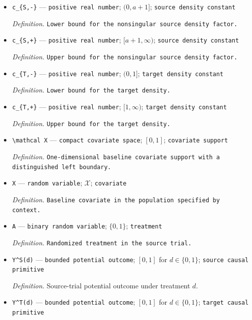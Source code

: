 \documentclass{article}
\begin{document}
\begin{itemize}
  \item \texttt{c\_\allowbreak{}\{S,\allowbreak{}-\allowbreak{}\}\allowbreak{}} --- \texttt{positive real number}; \((0,a+1]\); \texttt{source density constant}
  \par\smallskip\noindent\emph{Definition.} \texttt{Lower bound for the nonsingular source density factor.}
  \item \texttt{c\_\allowbreak{}\{S,\allowbreak{}+\allowbreak{}\}\allowbreak{}} --- \texttt{positive real number}; \([a+1,\infty)\); \texttt{source density constant}
  \par\smallskip\noindent\emph{Definition.} \texttt{Upper bound for the nonsingular source density factor.}
  \item \texttt{c\_\allowbreak{}\{T,\allowbreak{}-\allowbreak{}\}\allowbreak{}} --- \texttt{positive real number}; \((0,1]\); \texttt{target density constant}
  \par\smallskip\noindent\emph{Definition.} \texttt{Lower bound for the target density.}
  \item \texttt{c\_\allowbreak{}\{T,\allowbreak{}+\allowbreak{}\}\allowbreak{}} --- \texttt{positive real number}; \([1,\infty)\); \texttt{target density constant}
  \par\smallskip\noindent\emph{Definition.} \texttt{Upper bound for the target density.}
  \item \texttt{\textbackslash{}\allowbreak{}mathcal X} --- \texttt{compact covariate space}; \([0,1]\); \texttt{covariate support}
  \par\smallskip\noindent\emph{Definition.} \texttt{One-\allowbreak{}dimensional baseline covariate support with a distinguished left boundary.}
  \item \texttt{X} --- \texttt{random variable}; \(\mathcal X\); \texttt{covariate}
  \par\smallskip\noindent\emph{Definition.} \texttt{Baseline covariate in the population specified by context.}
  \item \texttt{A} --- \texttt{binary random variable}; \(\{0,1\}\); \texttt{treatment}
  \par\smallskip\noindent\emph{Definition.} \texttt{Randomized treatment in the source trial.}
  \item \texttt{Y\textasciicircum{}S(d)} --- \texttt{bounded potential outcome}; \([0,1]\) for \(d\in\{0,1\}\); \texttt{source causal primitive}
  \par\smallskip\noindent\emph{Definition.} Source-trial potential outcome under treatment \(d\).
  \item \texttt{Y\textasciicircum{}T(d)} --- \texttt{bounded potential outcome}; \([0,1]\) for \(d\in\{0,1\}\); \texttt{target causal primitive}

\end{itemize}
\end{document}
